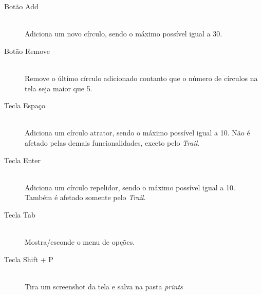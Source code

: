 \documentclass[12pt]{article}
\begin{document}
\begin{description}
\item[Botão Add] \hfill \\
Adiciona um novo círculo, sendo o máximo possível igual a 30.
\vspace{0.4 true cm}

\item[Botão Remove] \hfill \\
Remove o último círculo adicionado contanto que o número de círculos na tela seja maior que 5.
\vspace{0.4 true cm}

\item[Tecla Espaço] \hfill \\
Adiciona um círculo atrator, sendo o máximo possível igual a 10. Não é afetado pelas demais funcionalidades, exceto pelo \textit{Trail}.
\vspace{0.4 true cm}

\item[Tecla Enter] \hfill \\
Adiciona um círculo repelidor, sendo o máximo possível igual a 10. Também é afetado somente pelo \textit{Trail}.
\vspace{0.4 true cm}

\item[Tecla Tab] \hfill \\
Mostra/esconde o menu de opções.
\vspace{0.4 true cm}

\item[Tecla Shift + P] \hfill \\
Tira um screenshot da tela e salva na pasta \textit{prints}

\end{description}
\end{document}
